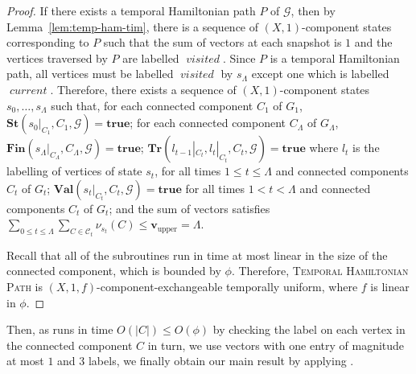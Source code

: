 \documentclass[a4paper,UKenglish,cleveref, autoref, thm-restate]{lipics-v2021} %
\DeclareMathOperator{\visited}{\textit{visited}}
\DeclareMathOperator{\current}{\textit{current}}
\begin{document}
\begin{toappendix}
\begin{proof}
    If there exists a temporal Hamiltonian path $P$ of $\mathcal{G}$, then by Lemma~\ref{lem:temp-ham-tim}, there is a sequence of $(X,1)$-component states corresponding to $P$ such that the sum of vectors at each snapshot is $1$ and the vertices traversed by $P$ are labelled $\visited$. Since $P$ is a temporal Hamiltonian path, all vertices must be labelled $\visited$ by $s_{\Lambda}$ except one which is labelled $\current$. Therefore, there exists a sequence of $(X,1)$-component states $s_0,\ldots,s_{\Lambda}$ such that, for each connected component $C_1$ of $G_1$, $\textbf{St}(s_0|_{C_1},C_1,\mathcal{G})=\textbf{true}$; for each connected component $C_{\Lambda}$ of $G_{\Lambda}$, $\textbf{Fin}(s_{\Lambda}|_{C_{\Lambda}},C_{\Lambda},\mathcal{G})=\textbf{true}$; $\textbf{Tr}(l_{t-1}|_{C_t}, l_t|_{C_t}, C_t,\mathcal{G})=\textbf{true}$ where $l_t$ is the labelling of vertices of state $s_t$, for all times $1 \leq t \leq \Lambda$ and connected components $C_t$ of $G_t$; $\textbf{Val}(s_t|_{C_t}, C_t,\mathcal{G})=\textbf{true}$ for all times $1 < t < \Lambda$ and connected components $C_t$ of $G_t$; and the sum of vectors satisfies $\sum_{0\leq t\leq \Lambda} \sum_{C \in\mathcal{C}_t}\nu_{s_t} (C)\leq \textbf{v}_{\text{upper}}=\Lambda$. 
    
    Recall that all of the subroutines run in time at most linear in the size of the connected component, which is bounded by $\phi$. Therefore, \textsc{Temporal Hamiltonian Path} is $(X,1,f)$-component-exchangeable temporally uniform, where $f$ is linear in $\phi$. 
\end{proof}
Then, as  runs in time $O(|C|)\leq O(\phi)$ by checking the label on each vertex in the connected component $C$ in turn, we use vectors with one entry of magnitude at most $1$ and 3 labels, we finally obtain our main result by applying .

\TIMhampath*



\end{toappendix}
\end{document}
